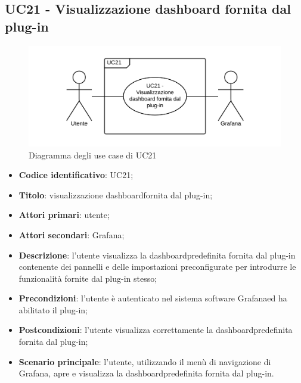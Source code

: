 \subsection{UC21 - Visualizzazione dashboard fornita dal plug-in}
\begin{figure}[H]
	\includegraphics{img/UC21_-_Visualizzazione_dashboard_fornita_dal_plug-_in.png}
	\caption{Diagramma degli use case di UC21}
\end{figure}
\begin{itemize}
	\item \textbf{Codice identificativo}: UC21;
	\item \textbf{Titolo}: visualizzazione dashboard\glosp fornita dal plug-in;
	\item \textbf{Attori primari}: utente;
	\item \textbf{Attori secondari}: Grafana\glo;
	\item \textbf{Descrizione}: l'utente visualizza la dashboard\glosp predefinita fornita dal plug-in contenente dei pannelli e delle impostazioni preconfigurate per introdurre le funzionalità fornite dal plug-in stesso;
	\item \textbf{Precondizioni}: l'utente è autenticato nel sistema software Grafana\glosp ed ha abilitato il plug-in;
	\item \textbf{Postcondizioni}: l'utente visualizza correttamente la dashboard\glosp predefinita fornita dal plug-in;
	\item \textbf{Scenario principale}: l'utente, utilizzando il menù di navigazione di Grafana\glo, apre e visualizza la dashboard\glosp predefinita fornita dal plug-in.
\end{itemize} 
